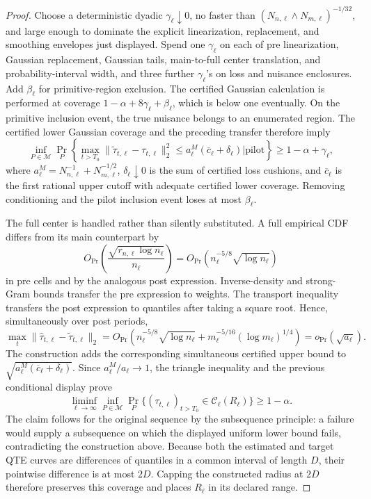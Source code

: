 \documentclass{article}
\begin{document}
\begin{proof}
Choose a deterministic dyadic \(\gamma_\ell\downarrow0\), no faster than
\((N_{n,\ell}\wedge N_{m,\ell})^{-1/32}\), and large enough to dominate the explicit linearization, replacement, and smoothing envelopes just displayed.  Spend one \(\gamma_\ell\) on each of pre linearization, Gaussian replacement, Gaussian tails, main-to-full center translation, and probability-interval width, and three further \(\gamma_\ell\)'s on loss and nuisance enclosures.  Add \(\beta_\ell\) for primitive-region exclusion.  The certified Gaussian calculation is performed at coverage
\(1-\alpha+8\gamma_\ell+\beta_\ell\), which is below one eventually.  On the primitive inclusion event, the true nuisance belongs to an enumerated region.  The certified lower Gaussian coverage and the preceding transfer therefore imply
\[
 \inf_{P\in\mathcal M}
 \Pr_P\left\{
 \max_{t>T_0}\|\widetilde\tau_{t,\ell}-\tau_{t,\ell}\|_2^2
 \leq a^M_\ell(\overline c_\ell+\delta_\ell)
 \mathrel{\big|}\text{pilot}\right\}
 \geq1-\alpha+\gamma_\ell,
\]
where \(a^M_\ell=N_{n,\ell}^{-1}+N_{m,\ell}^{-1/2}\),
\(\delta_\ell\downarrow0\) is the sum of certified loss cushions, and
\(\overline c_\ell\) is the first rational upper cutoff with adequate certified lower coverage.  Removing conditioning and the pilot inclusion event loses at most \(\beta_\ell\).

The full center is handled rather than silently substituted.  A full empirical CDF differs from its main counterpart by
\[
 O_{\Pr}\left(\frac{\sqrt{r_{n,\ell}\log n_\ell}}{n_\ell}\right)
 =O_{\Pr}(n_\ell^{-5/8}\sqrt{\log n_\ell})
\]
in pre cells and by the analogous post expression.  Inverse-density and strong-Gram bounds transfer the pre expression to weights.  The transport inequality transfers the post expression to quantiles after taking a square root.  Hence, simultaneously over post periods,
\[
 \max_t\|\widehat\tau_{t,\ell}-\widetilde\tau_{t,\ell}\|_2
 =O_{\Pr}\left(n_\ell^{-5/8}\sqrt{\log n_\ell}
 +m_\ell^{-5/16}(\log m_\ell)^{1/4}\right)
 =o_{\Pr}(\sqrt{a_\ell}).
\]
The construction adds the corresponding simultaneous certified upper bound to
\(\sqrt{a^M_\ell(\overline c_\ell+\delta_\ell)}\).  Since
\(a^M_\ell/a_\ell\to1\), the triangle inequality and the previous conditional display prove
\[
 \liminf_{\ell\to\infty}\inf_{P\in\mathcal M}
 \Pr_P\{(\tau_{t,\ell})_{t>T_0}\in\mathcal C_\ell(R_\ell)\}
 \geq1-\alpha.
\]
The claim follows for the original sequence by the subsequence principle: a failure would supply a subsequence on which the displayed uniform lower bound fails, contradicting the construction above.
Because both the estimated and target QTE curves are differences of quantiles in a common interval of length \(D\), their pointwise difference is at most \(2D\).  Capping the constructed radius at \(2D\) therefore preserves this coverage and places \(R_\ell\) in its declared range.


\end{proof}
\end{document}
